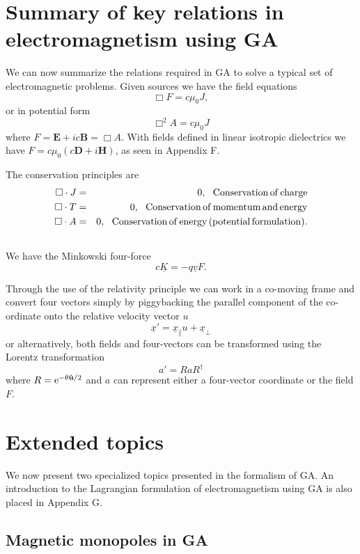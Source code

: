 \documentclass[12pt,aps,prb,preprint]{revtex4}   %
\newcommand{\be}{\begin{equation}}
\newcommand{\ee}{\end{equation}}
\newcommand{\bea}{\begin{eqnarray}}
\newcommand{\eea}{\end{eqnarray}}
\newcommand{\rme}{{\rm{e}}}
\newcommand{\iGA}{{i}}
\begin{document}
\section{Summary of key relations in electromagnetism using GA}

We can now summarize the relations required in GA to solve a typical set of electromagnetic problems.  
Given sources we have the field equations
\be
\Box F = c \mu_0 J,
\ee
or in potential form
\be
\Box^2 A = c \mu_0 J
\ee
where $ F = \textbf{E} + \iGA c \textbf{B} = \Box A $.  With fields defined in linear isotropic dielectrics we have $ F = c \mu_0 ( c \textbf{D} + \iGA \textbf{H} ) $, as seen in Appendix F.

The conservation principles are
\bea
\Box  \cdot J & = & 0 , \,\,\,\, \rm{Conservation \, of \, charge} \\ \nonumber
\Box  \cdot T & = & 0 , \,\,\,\, \rm{Conservation \, of \, momentum \, and \, energy} \\ \nonumber
\Box  \cdot A & = & 0 , \,\,\,\, \rm{Conservation \, of \, energy \, (potential \, formulation). } \\ \nonumber
\eea
We have the Minkowski four-force 
\be
c \underline{K} = - q \underline{v} F .
\ee

Through the use of the relativity principle we can work in a co-moving frame and convert four vectors simply by piggybacking the parallel component of the co-ordinate onto the relative velocity vector $ u $
\be
\underline{x}' = \underline{x}_{\|} u + \underline{x}_{\perp}
\ee
or alternatively, both fields and four-vectors can be transformed using the Lorentz transformation
\be
a' = R a R^{\dagger}
\ee
where $ R = \rme^{- \theta \mathbf{\hat{u}} /2} $ and $ a $ can represent either a four-vector coordinate or the field $ F $.


\section{Extended topics}

We now present two specialized topics presented in the formalism of GA.  An introduction to the Lagrangian formulation of electromagnetism using GA is also placed in Appendix G.

\subsection{Magnetic monopoles in GA}
\end{document}
